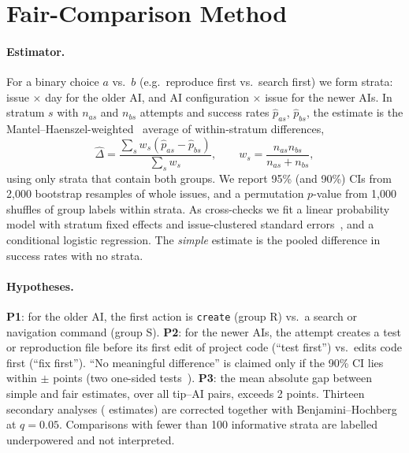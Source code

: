 \documentclass[sigconf,review=false,anonymous=false]{acmart}
\begin{document}
\begin{table}[t]
  \caption{Datasets as analysed (attempts with identical input and known outcome).}
  \label{tab:data}
  \footnotesize
  \resizebox{\textwidth}{!}{}
\end{table}

\section{Fair-Comparison Method}

\paragraph{Estimator.} For a binary choice $a$ vs.\ $b$ (e.g.\ reproduce first vs.\ search first) we form strata: issue $\times$ day for the older AI, and AI configuration $\times$ issue for the newer AIs. In stratum $s$ with $n_{as}$ and $n_{bs}$ attempts and success rates $\hat p_{as}$, $\hat p_{bs}$, the estimate is the Mantel--Haenszel-weighted~\cite{mantel1959} average of within-stratum differences,
\[
  \hat\Delta = \frac{\sum_s w_s(\hat p_{as}-\hat p_{bs})}{\sum_s w_s},\qquad w_s=\frac{n_{as}n_{bs}}{n_{as}+n_{bs}},
\]
using only strata that contain both groups. We report 95\% (and 90\%) CIs from 2,000 bootstrap resamples of whole issues, and a permutation $p$-value from 1,000 shuffles of group labels within strata. As cross-checks we fit a linear probability model with stratum fixed effects and issue-clustered standard errors~\cite{cameron2015,angrist2009}, and a conditional logistic regression. The \emph{simple} estimate is the pooled difference in success rates with no strata.

\paragraph{Hypotheses.} \textbf{P1}: for the older AI, the first action is \texttt{create} (group R) vs.\ a search or navigation command (group S). \textbf{P2}: for the newer AIs, the attempt creates a test or reproduction file before its first edit of project code (``test first'') vs.\ edits code first (``fix first''). ``No meaningful difference'' is claimed only if the 90\% CI lies within $\pm$\Margin{} points (two one-sided tests~\cite{schuirmann1987}). \textbf{P3}: the mean absolute gap between simple and fair estimates, over all tip--AI pairs, exceeds 2 points. Thirteen secondary analyses (\NumSecondary{} estimates) are corrected together with Benjamini--Hochberg~\cite{benjamini1995} at $q=0.05$. Comparisons with fewer than 100 informative strata are labelled underpowered and not interpreted.
\end{document}
